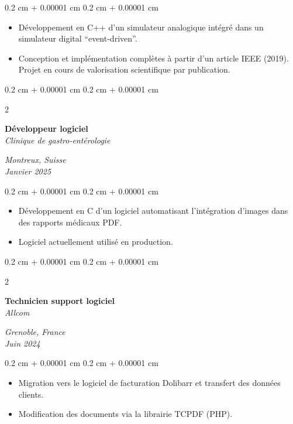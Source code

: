 \documentclass[10pt, letterpaper]{article}
\newenvironment{highlights}{
    \begin{itemize}[
        topsep=0.10 cm,
        parsep=0.10 cm,
        partopsep=0pt,
        itemsep=0pt,
        leftmargin=0.4 cm + 10pt
    ]
}{
    \end{itemize}
} %
\newenvironment{onecolentry}{
    \begin{adjustwidth}{
        0.2 cm + 0.00001 cm
    }{
        0.2 cm + 0.00001 cm
    }
}{
    \end{adjustwidth}
} %
\newenvironment{twocolentry}[2][]{
    \onecolentry
    \def\secondColumn{#2}
    \setcolumnwidth{\fill, 4.5 cm}
    \begin{paracol}{2}
}{
    \switchcolumn \raggedleft \secondColumn
    \end{paracol}
    \endonecolentry
} %
\begin{document}
\vspace{0.10cm}
\begin{onecolentry}
    \begin{highlights}
        \item Développement en C++ d’un simulateur analogique intégré dans un simulateur digital “event-driven”.
        \item Conception et implémentation complètes à partir d’un article IEEE (2019). Projet en cours de valorisation scientifique par publication.
    \end{highlights}
\end{onecolentry}

\vspace{0.3cm}
\begin{twocolentry}{\textit{Montreux, Suisse} \\
\textit{Janvier 2025}}
    \textbf{Développeur logiciel} \\
    \textit{Clinique de gastro-entérologie}
\end{twocolentry}

\vspace{0.10cm}
\begin{onecolentry}
    \begin{highlights}
        \item Développement en C d’un logiciel automatisant l’intégration d’images dans des rapports médicaux PDF.
        \item Logiciel actuellement utilisé en production.
    \end{highlights}
\end{onecolentry}

\vspace{0.3cm}
\begin{twocolentry}{\textit{Grenoble, France} \\
\textit{Juin 2024}}
    \textbf{Technicien support logiciel} \\
    \textit{Allcom}
\end{twocolentry}

\vspace{0.10cm}
\begin{onecolentry}
    \begin{highlights}
        \item Migration vers le logiciel de facturation Dolibarr et transfert des données clients.
        \item Modification des documents via la librairie TCPDF (PHP).
    \end{highlights}
\end{onecolentry}
\end{document}
